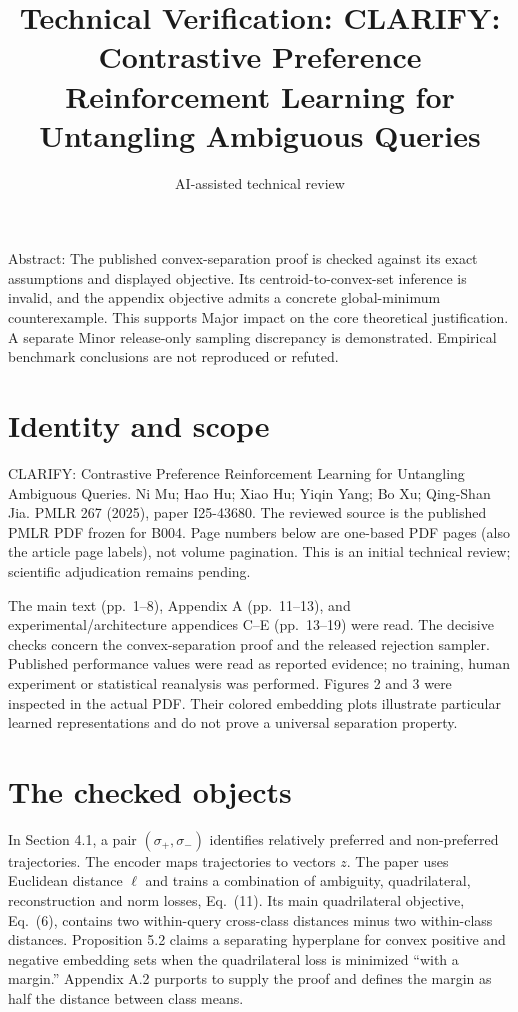 \documentclass[10pt]{article}
\title{Technical Verification: CLARIFY: Contrastive Preference Reinforcement Learning for Untangling Ambiguous Queries}
\author{AI-assisted technical review}
\date{}
\begin{document}
\maketitle
Abstract: The published convex-separation proof is checked against its exact assumptions and displayed objective. Its centroid-to-convex-set inference is invalid, and the appendix objective admits a concrete global-minimum counterexample. This supports Major impact on the core theoretical justification. A separate Minor release-only sampling discrepancy is demonstrated. Empirical benchmark conclusions are not reproduced or refuted.\par
\section*{Identity and scope}
CLARIFY: Contrastive Preference Reinforcement Learning for Untangling Ambiguous Queries. Ni Mu; Hao Hu; Xiao Hu; Yiqin Yang; Bo Xu; Qing-Shan Jia. PMLR 267 (2025), paper I25-43680. The reviewed source is the published PMLR PDF frozen for B004. Page numbers below are one-based PDF pages (also the article page labels), not volume pagination. This is an initial technical review; scientific adjudication remains pending.\par
The main text (pp. 1–8), Appendix A (pp. 11–13), and experimental/architecture appendices C–E (pp. 13–19) were read. The decisive checks concern the convex-separation proof and the released rejection sampler. Published performance values were read as reported evidence; no training, human experiment or statistical reanalysis was performed. Figures 2 and 3 were inspected in the actual PDF. Their colored embedding plots illustrate particular learned representations and do not prove a universal separation property.\par
\section*{The checked objects}
In Section 4.1, a pair \((\sigma_+,\sigma_-)\) identifies relatively preferred and non-preferred trajectories. The encoder maps trajectories to vectors \(z\). The paper uses Euclidean distance \(\ell\) and trains a combination of ambiguity, quadrilateral, reconstruction and norm losses, Eq. (11). Its main quadrilateral objective, Eq. (6), contains two within-query cross-class distances minus two within-class distances. Proposition 5.2 claims a separating hyperplane for convex positive and negative embedding sets when the quadrilateral loss is minimized “with a margin.” Appendix A.2 purports to supply the proof and defines the margin as half the distance between class means.\par
\end{document}
